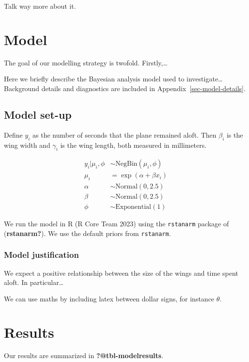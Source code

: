 \documentclass[
  letterpaper,
  DIV=11,
  numbers=noendperiod]{scrartcl}
\begin{document}
Talk way more about it.

\section{Model}\label{model}

The goal of our modelling strategy is twofold. Firstly,\ldots{}

Here we briefly describe the Bayesian analysis model used to
investigate\ldots{} Background details and diagnostics are included in
Appendix~\ref{sec-model-details}.

\subsection{Model set-up}\label{model-set-up}

Define \(y_i\) as the number of seconds that the plane remained aloft.
Then \(\beta_i\) is the wing width and \(\gamma_i\) is the wing length,
both measured in millimeters.

\begin{align}
y_i | \mu_i, \phi &\sim \text{NegBin}(\mu_i, \phi) \\
\mu_i &= \exp(\alpha + \beta x_i) \\
\alpha &\sim \text{Normal}(0, 2.5) \\
\beta &\sim \text{Normal}(0, 2.5) \\
\phi &\sim \text{Exponential}(1)
\end{align}

We run the model in R (R Core Team 2023) using the \texttt{rstanarm}
package of (\textbf{rstanarm?}). We use the default priors from
\texttt{rstanarm}.

\subsubsection{Model justification}\label{model-justification}

We expect a positive relationship between the size of the wings and time
spent aloft. In particular\ldots{}

We can use maths by including latex between dollar signs, for instance
\(\theta\).

\section{Results}\label{results}

Our results are summarized in \textbf{?@tbl-modelresults}.
\end{document}
